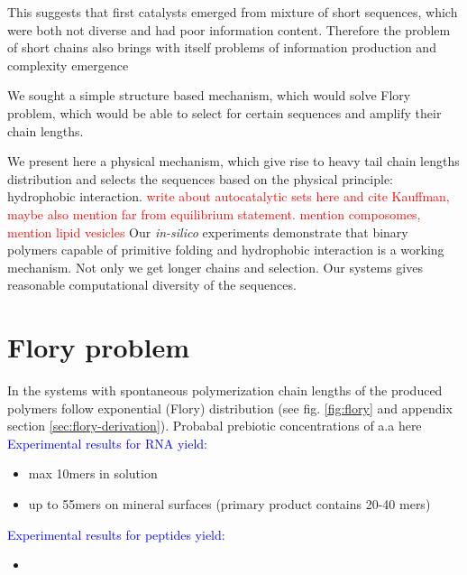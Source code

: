 \documentclass[12pt]{paper}
\newcommand{\red}[1]{\textcolor{red}{#1}}
\newcommand{\blue}[1]{\textcolor{blue}{#1}}
\begin{document}
This suggests that first catalysts emerged from mixture of short sequences, which were both 
not diverse and had poor information content. Therefore the problem of short chains also brings 
with itself problems of information production and complexity emergence \cite{Joyce1987,Abel2005}

 We sought a simple structure based mechanism, 
which would solve Flory problem, which would be able to select for certain sequences and 
amplify their chain lengths.

 We present here a physical mechanism, which give rise to 
heavy tail chain lengths distribution and selects the sequences based on the physical principle: 
hydrophobic interaction. 
\red{write about autocatalytic sets here and cite Kauffman, maybe also mention far from 
equilibrium statement. mention composomes, mention lipid vesicles \cite{Luisi1999,Deamer2008}}
Our \textit{in-silico} experiments demonstrate that binary polymers 
capable of primitive folding and hydrophobic interaction is a working mechanism. Not only we get 
longer chains and selection. Our systems gives reasonable computational diversity of the sequences.


   
\section{Flory problem}\label{sec:flory}
In the systems with spontaneous polymerization chain lengths of the produced polymers follow 
exponential (Flory) distribution (see fig. \ref{fig:flory} and appendix section 
\ref{sec:flory-derivation}).
Probabal prebiotic concentrations of a.a here \cite{Aubrey2009}
\blue{Experimental results for RNA yield:}
\begin{itemize}
 \item max 10mers \cite{Ferris1996} in solution
 \item up to 55mers on mineral surfaces \cite{Ferris1996} (primary product contains 20-40 mers)
\end{itemize}
\blue{Experimental results for peptides yield:}
\begin{itemize}
 \item 
\end{itemize}
\end{document}
